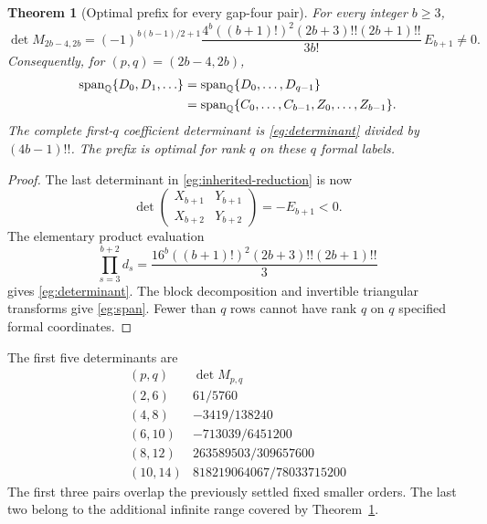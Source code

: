 \documentclass[11pt]{article}
\newtheorem{theorem}{Theorem}[section]
\theoremstyle{definition}
\theoremstyle{remark}
\numberwithin{equation}{section}
\begin{document}
\begin{theorem}[Optimal prefix for every gap-four pair]\label{eg:main}
For every integer $b\ge3$,
\begin{equation}\label{eg:determinant}
 \boxed{\displaystyle
 \det M_{2b-4,2b}
 =(-1)^{b(b-1)/2+1}
   \frac{4^b((b+1)!)^2(2b+3)!!(2b+1)!!}{3b!}\,E_{b+1}\ne0.}
\end{equation}
Consequently, for $(p,q)=(2b-4,2b)$,
\begin{align}\label{eg:span}
 \operatorname{span}_{\mathbb Q}\{D_0,D_1,\ldots\}
 &=\operatorname{span}_{\mathbb Q}\{D_0,\ldots,D_{q-1}\}\notag\\
 &=\operatorname{span}_{\mathbb Q}
     \{C_0,\ldots,C_{b-1},Z_0,\ldots,Z_{b-1}\}.
\end{align}
The complete first-$q$ coefficient determinant is
\eqref{eg:determinant} divided by $(4b-1)!!$. The prefix is optimal
for rank $q$ on these $q$ formal labels.
\end{theorem}

\begin{proof}
The last determinant in \eqref{eg:inherited-reduction} is now
\[
 \det\begin{pmatrix}X_{b+1}&Y_{b+1}\\X_{b+2}&Y_{b+2}\end{pmatrix}
 =-E_{b+1}<0.
\]
The elementary product evaluation
\[
 \prod_{s=3}^{b+2}d_s
 =\frac{16^b((b+1)!)^2(2b+3)!!(2b+1)!!}{3}
\]
gives \eqref{eg:determinant}. The block decomposition and invertible
triangular transforms give \eqref{eg:span}. Fewer than $q$ rows cannot
have rank $q$ on $q$ specified formal coordinates.
\end{proof}

The first five determinants are
\[
\begin{array}{c|c}
(p,q)&\det M_{p,q}\\\hline
(2,6)&61/5760\\
(4,8)&-3419/138240\\
(6,10)&-713039/6451200\\
(8,12)&263589503/309657600\\
(10,14)&818219064067/78033715200
\end{array}
\]
The first three pairs overlap the previously settled fixed smaller
orders. The last two belong to the additional infinite range covered
by Theorem~\ref{eg:main}.
\end{document}
